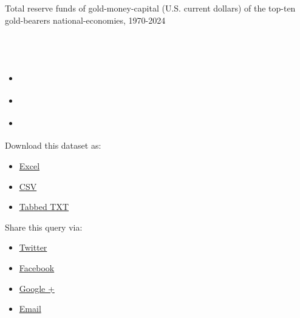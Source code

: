 \documentclass[
]{article}
\providecommand{\tightlist}{%
  \setlength{\itemsep}{0pt}\setlength{\parskip}{0pt}}
\begin{document}
\hypertarget{widgetDesc}{}
Total reserve funds of gold-money-capital (U.S. current dollars) of the
top-ten gold-bearers national-economies, 1970-2024

\hypertarget{widgetpreview}{}
\hypertarget{widgetpreviewcontent}{}
\hypertarget{divtoolbar}{}
\hypertarget{section}{%
\subsection{\texorpdfstring{\protect\hypertarget{lblTitle}{}{~}}{~}}\label{section}}

\begin{itemize}
\tightlist
\item
  \protect\hypertarget{aAboutReport}{\href{../../../views/reports/\#widget-description-panel}{{}}}
\item
  \protect\hypertarget{aDownloadData}{\href{../../../views/reports/\#widget-download-panel}{{}}}
\item
  \protect\hypertarget{aShareQuery}{\href{../../../views/reports/\#widget-share-panel}{{}}}
\end{itemize}

\hypertarget{widget-description-panel}{}

\hypertarget{widget-download-panel}{}
Download this dataset as:

\begin{itemize}
\tightlist
\item
  \protect\hyperlink{}{{}\protect\hypertarget{sExcel}{}{Excel}}
\item
  \protect\hyperlink{}{{}\protect\hypertarget{sCSV}{}{CSV}}
\item
  \protect\hyperlink{}{{}\protect\hypertarget{sTabbedTXT}{}{Tabbed TXT}}
\end{itemize}

\hypertarget{widget-share-panel}{}
Share this query via:

\begin{itemize}
\tightlist
\item
  \href{Javascript:Widgettwitter();}{{}\protect\hypertarget{sTwitter}{}{Twitter}}
\item
  \href{Javascript:Widgetfacebook();}{{}\protect\hypertarget{sFaceBook}{}{Facebook}}
\item
  \href{Javascript:WidgetGooglePlus();}{{}\protect\hypertarget{sGooglePlus}{}{Google
  +}}
\item
  \href{Javascript:WidgetEmail();}{{}\protect\hypertarget{sEmail}{}{Email}}
\end{itemize}
\end{document}
